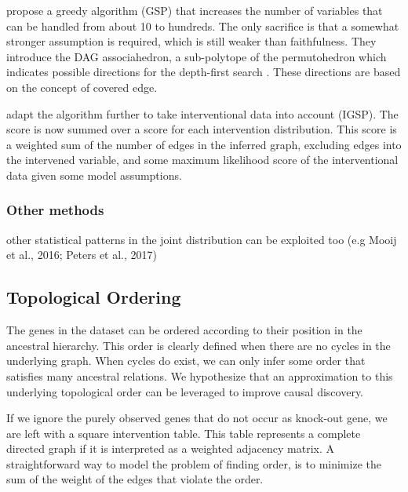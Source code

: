 \citet{solus2017consistency} propose a greedy algorithm (GSP) that increases the number of variables that can be handled from about 10 to hundreds. The only sacrifice is that a somewhat stronger assumption is required, which is still weaker than faithfulness. They introduce the DAG associahedron, a sub-polytope of the permutohedron which indicates possible directions for the depth-first search . These directions are based on the concept of covered edge. 

\citet{wang2017permutation} adapt the algorithm further to take interventional data into account (IGSP). The score is now summed over a score for each intervention distribution. This score is a weighted sum of the number of edges in the inferred graph, excluding edges into the intervened variable, and some maximum likelihood score of the interventional data given some model assumptions.





\subsubsection*{Other methods}
other statistical patterns in the joint distribution can be exploited too (e.g Mooij et al., 2016; Peters et al., 2017)




\subsection*{Topological Ordering}
The genes in the dataset can be ordered according to their position in the ancestral hierarchy. This order is clearly defined when there are no cycles in the underlying graph. When cycles do exist, we can only infer some order that satisfies many ancestral relations. We hypothesize that an approximation to this underlying topological order can be leveraged to improve causal discovery.

If we ignore the purely observed genes that do not occur as knock-out gene, we are left with a square intervention table. This table represents a complete directed graph if it is interpreted as a weighted adjacency matrix. A straightforward way to model the problem of finding order, is to minimize the sum of the weight of the edges that violate the order. 

